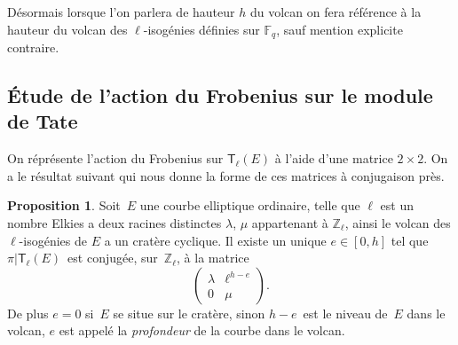 \documentclass[10pt,a4paper]{book}
\theoremstyle{plain}
\theoremstyle{definition}
\theoremstyle{definition}
\theoremstyle{definition}
\newtheorem{prop}[thm]{Proposition}
\theoremstyle{definition}
\theoremstyle{remark}
\theoremstyle{remark}
\theoremstyle{definition}
\begin{document}
Désormais lorsque l'on parlera de hauteur $h$ du volcan on fera référence à la
hauteur du volcan des $\ell$-isogénies définies sur $\mathbb{F}_q$, sauf mention 
 explicite contraire.
\subsection{\'Etude de l'action du Frobenius sur le module de Tate}
\label{subs:elk:dir}

On réprésente l'action du Frobenius sur $\mathsf{T}_{\ell}(E)$ à l'aide d'une matrice $
2 \times 2$. On a le résultat suivant qui nous donne la forme de ces matrices à
conjugaison près.


\begin{prop}\label{pro:mat:fro}
Soit~$E$ une courbe elliptique ordinaire, telle que $\ell$ est un nombre Elkies
a deux racines distinctes $\lambda$, $\mu$ appartenant à $\mathbb{Z}_{\ell}$,
ainsi le volcan des $\ell$-isogénies de $E$ a un cratère cyclique.
Il existe un unique $e \in [ 0, h]$
tel que $\pi|\mathsf{T}_{\ell}(E)$~est conjugée, sur~$\mathbb{Z}_{\ell}$,
à la matrice 
\begin{equation*}
\left ( \begin{matrix}\lambda & \ell^{h-e} \\ 0 & \mu
\end{matrix}\right ).
\end{equation*}
De plus $e = 0$ si~$E$ se situe sur le cratère,
sinon $h - e$~est le niveau de~$E$ dans le volcan, $e$ est appelé la \emph{profondeur}
de la courbe dans le volcan.
\end{prop}
\end{document}
